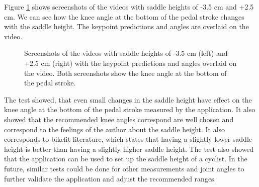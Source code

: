Figure \ref{fig:saddle_height_setup} shows screenshots of the videos with saddle heights of -3.5 cm and +2.5 cm. We can see how the knee angle at the bottom of the pedal stroke changes with the saddle height. The keypoint predictions and angles are overlaid on the video.

\begin{figure}[htbp]
    \hfill
    \caption{Screenshots of the videos with saddle heights of -3.5 cm (left) and +2.5 cm (right) with the keypoint predictions and angles overlaid on the video. Both screenshots show the knee angle at the bottom of the pedal stroke.}
    \label{fig:saddle_height_setup}

\end{figure}

The test showed, that even small changes in the saddle height have effect on the knee angle at the bottom of the pedal stroke measured by the application. It also showed that the recommended knee angles correspond are well chosen and correspond to the feelings of the author about the saddle height. It also corresponds to bikefit literature, which states that having a slightly lower saddle height is better than having a slightly higher saddle height. The test also showed that the application can be used to set up the saddle height of a cyclist. In the future, similar tests could be done for other measurements and joint angles to further validate the application and adjust the recommended ranges.

